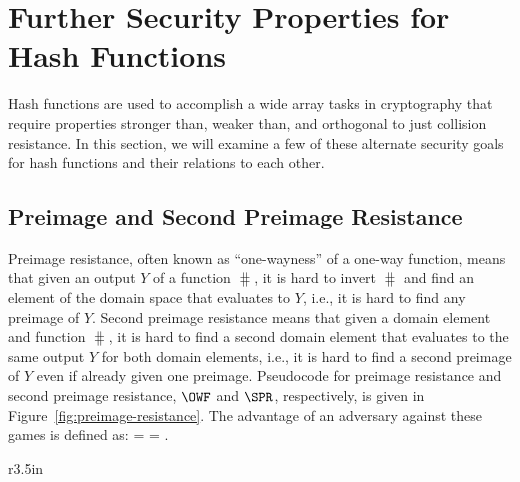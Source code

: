 \section{Further Security Properties for Hash Functions}

Hash functions are used to accomplish a wide array tasks in cryptography that require properties stronger than, weaker than, and orthogonal to just collision resistance.
In this section, we will examine a few of these alternate security goals for hash functions and their relations to each other.

\subsection{Preimage and Second Preimage Resistance}

Preimage resistance, often known as ``one-wayness'' of a one-way function, means that given an output $Y$ of a function $\hash$, it is hard to invert $\hash$ and find an element of the domain space that evaluates to $Y$, i.e., it is hard to find any preimage of $Y$.
Second preimage resistance means that given a domain element and function $\hash$, it is hard to find a second domain element that evaluates to the same output $Y$ for both domain elements, i.e., it is hard to find a second preimage of $Y$ even if already given one preimage.
Pseudocode for preimage resistance and second preimage resistance, $\OWF$ and $\SPR$, respectively, is given in Figure~\ref{fig:preimage-resistance}.
The advantage of an adversary against these games is defined as:
\bnm
\AdvOWF{\hash}{\advA} = \Prob{\OWF^\advA_{\hash}\Rightarrow\true}\hspace{2em}\hspace{2em}\AdvSPR{\hash}{\advA} = \Prob{\SPR^\advA_{\hash}\Rightarrow\true}\;.
\enm

\begin{wrapfigure}{r}{3.5in}
  \centering
{}
\caption{
Security games for Preimage resistance (left) and second preimage resistance (right).
}
\label{fig:preimage-resistance}
\end{wrapfigure}

